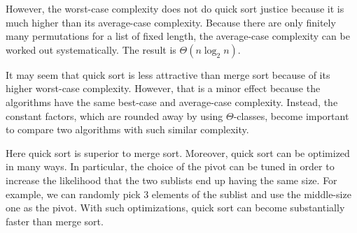 However, the worst-case complexity does not do quick sort justice because it is much higher than its average-case complexity.
Because there are only finitely many permutations for a list of fixed length, the average-case complexity can be worked out systematically.
The result is $\Theta(n\log_2 n)$.
\medskip

It may seem that quick sort is less attractive than merge sort because of its higher worst-case complexity.
However, that is a minor effect because the algorithms have the same best-case and average-case complexity.
Instead, the constant factors, which are rounded away by using $\Theta$-classes, become important to compare two algorithms with such similar complexity.

Here quick sort is superior to merge sort.
Moreover, quick sort can be optimized in many ways.
In particular, the choice of the pivot can be tuned in order to increase the likelihood that the two sublists end up having the same size.
For example, we can randomly pick $3$ elements of the sublist and use the middle-size one as the pivot.
With such optimizations, quick sort can become substantially faster than merge sort.

%
%
%
